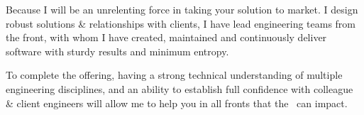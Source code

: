 Because I will be an unrelenting force in taking your solution to market. I design robust solutions \& relationships with clients, I have lead engineering teams from the front, with whom I have created, maintained and continuously deliver software with sturdy results and minimum entropy.

To complete the offering, having a strong technical understanding of multiple engineering disciplines, and an ability to establish full confidence with colleague \& client engineers will allow me to help you in all fronts that the \jobTitle \ can impact.